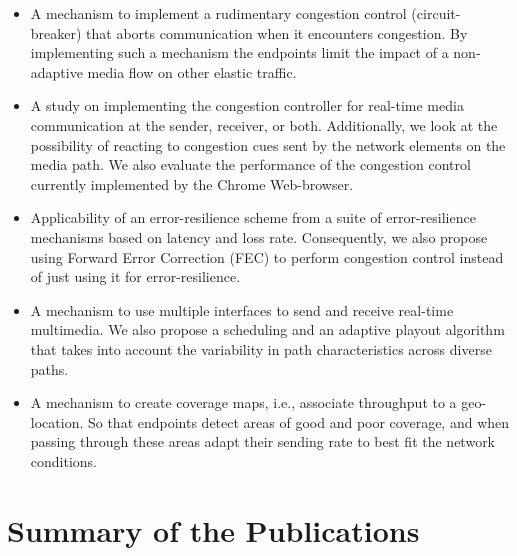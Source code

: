 \begin{itemize}
\setlength{\itemsep}{0pt}


\item A mechanism to implement a rudimentary congestion control (circuit-breaker) 
that aborts communication when it encounters congestion. By
implementing such a mechanism the endpoints limit the impact of a non-adaptive
media flow on other elastic traffic.

\item A study on implementing the congestion controller for real-time media
communication at the sender, receiver, or both. Additionally, we look at the
possibility of reacting to congestion cues sent by the network elements on the
media path. We also evaluate the performance of the congestion control
currently implemented by the Chrome Web-browser.

\item Applicability of an error-resilience scheme from a suite of
error-resilience mechanisms based on latency and loss rate. Consequently, we
also propose using Forward Error Correction (FEC) to perform congestion
control instead of just using it for error-resilience.

\item A mechanism to use multiple interfaces to send and receive real-time
multimedia. We also propose a scheduling and an adaptive playout algorithm
that takes into account the variability in path characteristics across diverse
paths.

\item A mechanism to create coverage maps, i.e., associate throughput to a
geo-location. So that endpoints detect areas of good and poor coverage, and
when passing through these areas adapt their sending rate to best fit the
network conditions.

\end{itemize}

\section{Summary of the Publications}

